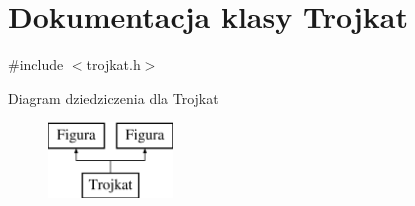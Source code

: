 \hypertarget{classTrojkat}{\section{Dokumentacja klasy Trojkat}
\label{classTrojkat}
}


{\ttfamily \#include $<$trojkat.\-h$>$}

Diagram dziedziczenia dla Trojkat\begin{figure}[H]
\begin{center}
\leavevmode
\includegraphics[height=2.000000cm]{classTrojkat}
\end{center}
\end{figure}
